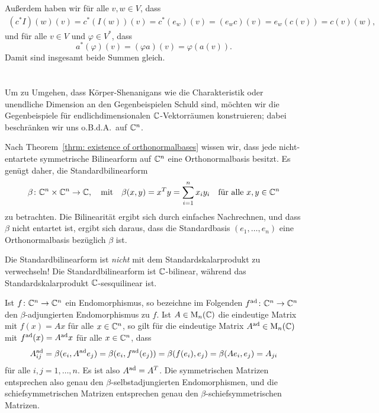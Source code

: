 \documentclass[a4paper,10pt,numbers=noenddot]{scrartcl}
\begin{document}
Außerdem haben wir für alle $v, w \in V$, dass
\begin{gather*}
    (c^* I)(w)(v)
  = c^*(I(w))(v)
  = c^*(e_w)(v)
  = (e_w c)(v)
  = e_w(c(v))
  = c(v)(w),
\end{gather*}
und für alle $v \in V$ und $\varphi \in V^*$, dass
\[
    a^*(\varphi)(v)
  = (\varphi a)(v)
  = \varphi(a(v)).
\]
Damit sind insgesamt beide Summen gleich.










\section{}


Um zu Umgehen, dass Körper-Shenanigans wie die Charakteristik oder unendliche Dimension an den Gegenbeispielen Schuld sind, möchten wir die Gegenbeispiele für endlichdimensionalen $\mathbb{C}$-Vektorräumen konstruieren; dabei beschränken wir uns o.B.d.A.\ auf $\mathbb{C}^n$.

Nach Theorem~\ref{thrm: existence of orthonormalbases} wissen wir, dass jede nicht-entartete symmetrische Bilinearform auf $\mathbb{C}^n$ eine Orthonormalbasis besitzt.
Es genügt daher, die Standardbilinearform
\[
  \beta \colon \mathbb{C}^n \times \mathbb{C}^n \to \mathbb{C},
  \quad\text{mit}\quad
    \beta(x,y)
  = x^T y
  = \sum_{i=1}^n x_i y_i
  \quad
  \text{für alle $x, y \in \mathbb{C}^n$}
\]
zu betrachten.
Die Bilinearität ergibt sich durch einfaches Nachrechnen, und dass $\beta$ nicht entartet ist, ergibt sich daraus, dass die Standardbasis $(e_1, \dotsc, e_n)$ eine Orthonormalbasis bezüglich $\beta$ ist.

\begin{remark}
  Die Standardbilinearform ist \emph{nicht} mit dem Standardskalarprodukt zu verwechseln!
  Die Standardbilinearform ist $\mathbb{C}$-bilinear, während das Standardskalarprodukt $\mathbb{C}$-sesquilinear ist.
\end{remark}

Ist $f \colon \mathbb{C}^n \to \mathbb{C}^n$ ein Endomorphismus, so bezeichne im Folgenden $f^{\mathrm{ad}} \colon \mathbb{C}^n \to \mathbb{C}^n$ den $\beta$-adjungierten Endomorphismus zu $f$.
Ist $A \in \operatorname{M}_n(\mathbb{C})$ die eindeutige Matrix mit $f(x) = Ax$ für alle $x \in \mathbb{C}^n$, so gilt für die eindeutige Matrix $A^{\mathrm{ad}} \in \operatorname{M}_n(\mathbb{C})$ mit $f^{\mathrm{ad}}(x) = A^{\mathrm{ad}} x$ für alle $x \in \mathbb{C}^n$, dass
\[
    A^{\mathrm{ad}}_{ij}
  = \beta(e_i, A^{\mathrm{ad}} e_j)
  = \beta(e_i, f^{\mathrm{ad}}(e_j))
  = \beta(f(e_i), e_j)
  = \beta(A e_i, e_j)
  = A_{ji}
\]
für alle $i,j = 1, \dotsc, n$.
Es ist also $A^{\mathrm{ad}} = A^T$.
Die symmetrischen Matrizen entsprechen also genau den $\beta$-selbstadjungierten Endomorphismen, und die schiefsymmetrischen Matrizen entsprechen genau den $\beta$-schiefsymmetrischen Matrizen.
\end{document}
